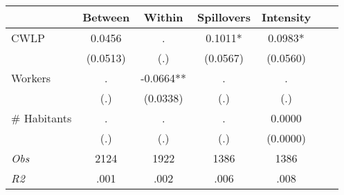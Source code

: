\begin{tabular}{l*{6}{c}}\hline&\multicolumn{1}{c}{Between}&\multicolumn{1}{c}{Within}&\multicolumn{1}{c}{Spillovers}&\multicolumn{1}{c}{Intensity}\\ \hline 
CWLP & 0.0456 & . & 0.1011* & 0.0983* \\
 & (0.0513) & (.) & (0.0567) & (0.0560) \\
Workers & . & -0.0664** & . & . \\
 & (.) & (0.0338) & (.) & (.) \\
\# Habitants & . & . & . & 0.0000 \\
  & (.) & (.) & (.) & (0.0000) \\
\hline \textit{Obs} & 2124 & 1922 & 1386 & 1386  \\ \textit{R2} & .001 & .002 & .006 & .008 \\ \hline \end{tabular}
